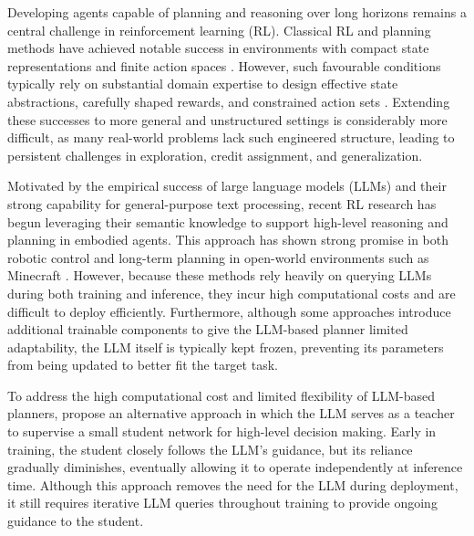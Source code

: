 Developing agents capable of planning and reasoning over long horizons remains a central challenge in reinforcement learning (RL). Classical RL and planning methods have achieved notable success in environments with compact state representations and finite action spaces \citep{BercherAL2019, PateriaSTQ2021}. However, such favourable conditions typically rely on substantial domain expertise to design effective state abstractions, carefully shaped rewards, and constrained action sets \citep{IbrahimMJSO2024}. Extending these successes to more general and unstructured settings is considerably more difficult, as many real-world problems lack such engineered structure, leading to persistent challenges in exploration, credit assignment, and generalization.

Motivated by the empirical success of large language models (LLMs) and their strong capability for general-purpose text processing, recent RL research has begun leveraging their semantic knowledge to support high-level reasoning and planning in embodied agents. This approach has shown strong promise in both robotic control \citep{AhnBBCC2022} and long-term planning in open-world environments such as Minecraft \citep{WangCMLJLM2024}. However, because these methods rely heavily on querying LLMs during both training and inference, they incur high computational costs and are difficult to deploy efficiently. Furthermore, although some approaches introduce additional trainable components to give the LLM-based planner limited adaptability, the LLM itself is typically kept frozen, preventing its parameters from being updated to better fit the target task. 

To address the high computational cost and limited flexibility of LLM-based planners, \citet{ZhouHZZL2024, LiPSFXZ2026} propose an alternative approach in which the LLM serves as a teacher to supervise a small student network for high-level decision making. Early in training, the student closely follows the LLM’s guidance, but its reliance gradually diminishes, eventually allowing it to operate independently at inference time. Although this approach removes the need for the LLM during deployment, it still requires iterative LLM queries throughout training to provide ongoing guidance to the student. 


